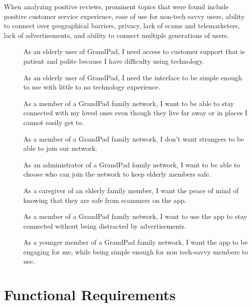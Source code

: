 When analyzing positive reviews, prominent topics that were found include
    positive customer service experience,
    ease of use for non-tech savvy users,
    ability to connect over geographical barriers,
    privacy,
    lack of scams and telemarketers,
    lack of advertisements,
    and ability to connect multiple generations of users.

\begin{description}
    \item[\textbf{\showuserhelpcounter}]
        As an elderly user of GrandPad, I need access to customer support that
            is patient and polite because I have difficulty using technology.
    \item[\textbf{\showuseruicounter}]
        As an elderly user of GrandPad, I need the interface to be simple enough
            to use with little to no technology experience.
    \item[\textbf{\showusernetcounter}]
        As a member of a GrandPad family network, I want to be able to stay
            connected with my loved ones even though they live far away or in
            places I cannot easily get to.
    \item[\textbf{\showusernetcounter}]
        As a member of a GrandPad family network, I don't want strangers to be
            able to join our network.
    \item[\textbf{\showusernetcounter}]
        As an administrator of a GrandPad family network, I want to be able to
            choose who can join the network to keep elderly members safe.
    \item[\textbf{\showusernetcounter}]
        As a caregiver of an elderly family member, I want the peace of mind of
            knowing that they are safe from scammers on the app.
    \item[\textbf{\showuseruicounter}]
        As a member of a GrandPad family network, I want to use the app to stay
            connected without being distracted by advertisements.
    \item[\textbf{\showuseruicounter}]
        As a younger member of a GrandPad family network, I want the app to be
            engaging for me, while being simple enough for non tech-savvy
            members to use.
\end{description}

\section*{Functional Requirements}

